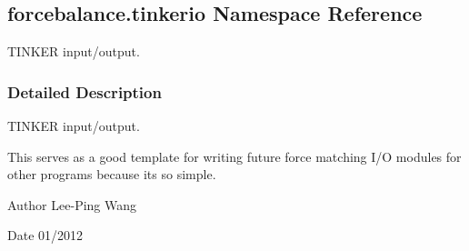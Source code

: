 \hypertarget{namespaceforcebalance_1_1tinkerio}{}\subsection{forcebalance.\+tinkerio Namespace Reference}
\label{namespaceforcebalance_1_1tinkerio}


T\+I\+N\+K\+ER input/output.  




\subsubsection{Detailed Description}
T\+I\+N\+K\+ER input/output. 

This serves as a good template for writing future force matching I/O modules for other programs because it\textquotesingle{}s so simple.

\begin{DoxyAuthor}{Author}
Lee-\/\+Ping Wang 
\end{DoxyAuthor}
\begin{DoxyDate}{Date}
01/2012 
\end{DoxyDate}
